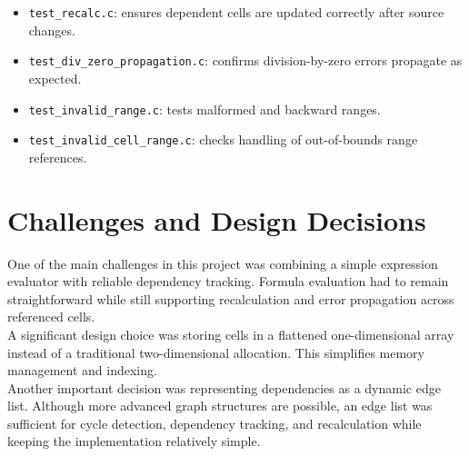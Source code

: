 \documentclass[12pt,a4paper]{article}
\begin{document}
\begin{itemize}
    \item \texttt{test\_recalc.c}: ensures dependent cells are updated correctly after source changes.
    \item \texttt{test\_div\_zero\_propagation.c}: confirms division-by-zero errors propagate as expected.
    \item \texttt{test\_invalid\_range.c}: tests malformed and backward ranges.
    \item \texttt{test\_invalid\_cell\_range.c}: checks handling of out-of-bounds range references.
\end{itemize}


\section{Challenges and Design Decisions}

One of the main challenges in this project was combining a simple expression evaluator with reliable dependency tracking. Formula evaluation had to remain straightforward while still supporting recalculation and error propagation across referenced cells.\\[0.1cm]

A significant design choice was storing cells in a flattened one-dimensional array instead of a traditional two-dimensional allocation. This simplifies memory management and indexing.\\[0.1cm]

Another important decision was representing dependencies as a dynamic edge list. Although more advanced graph structures are possible, an edge list was sufficient for cycle detection, dependency tracking, and recalculation while keeping the implementation relatively simple.
\end{document}
